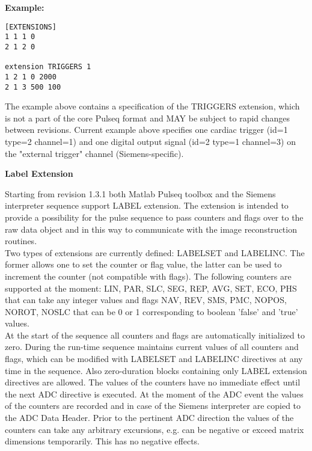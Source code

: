 \documentclass{article}
\begin{document}
\begin{minipage}{\textwidth}
\textbf{Example:}
\begin{lstlisting}
[EXTENSIONS]
1 1 1 0
2 1 2 0

extension TRIGGERS 1
1 2 1 0 2000
2 1 3 500 100
\end{lstlisting}
\end{minipage}

The example above contains a specification of the TRIGGERS extension, which is not a part of the core Pulseq format and MAY be subject to rapid changes between revisions. Current example above specifies one cardiac trigger (id=1 type=2 channel=1) and one digital output signal (id=2 type=1 channel=3) on the "external trigger" channel (Siemens-specific).

\textbf{Label Extension}

Starting from revision 1.3.1 both Matlab Pulseq toolbox and the Siemens interpreter sequence support LABEL extension. The extension is intended to provide a possibility for the pulse sequence to pass counters and flags over to the raw data object and in this way to communicate with the image reconstruction routines. \\ 

Two types of extensions are currently defined: LABELSET and LABELINC. The former allows one to set the counter or flag value, the latter can be used to increment the counter (not compatible with flags). The following counters are supported at the moment: 
LIN, PAR, SLC, SEG, REP, AVG, SET, ECO, PHS that can take any integer values and flags NAV, REV, SMS, PMC, NOPOS, NOROT, NOSLC that can be 0 or 1 corresponding to boolean 'false' and 'true' values. \\

At the start of the sequence all counters and flags are automatically initialized to zero. During the run-time sequence maintains current values of all counters and flags, which can be modified with LABELSET and LABELINC directives at any time in the sequence. Also zero-duration blocks containing only LABEL extension directives are allowed. The values of the counters have no immediate effect until the next ADC directive is executed. At the moment of the ADC event the values of the counters are recorded and in case of the Siemens interpreter are copied to the ADC Data Header. Prior to the pertinent ADC direction the values of the counters can take any arbitrary excursions, e.g. can be negative or exceed matrix dimensions temporarily. This has no negative effects. \\
\end{document}
